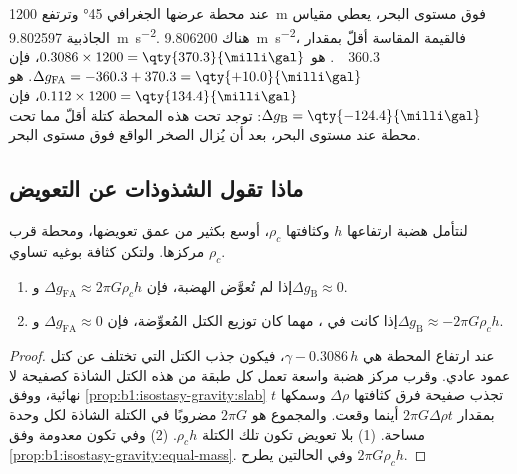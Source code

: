 \begin{example}\label{ex:b1:isostasy-gravity:reduction}
عند محطة عرضها الجغرافي \ang{45} وترتفع \qty{1200}{m} فوق مستوى البحر، يعطي مقياس الجاذبية \qty{9.802597}{m.s^{-2}}.  هناك \qty{9.806200}{m.s^{-2}}، فالقيمة المقاسة أقلّ بمقدار \qty{360.3}{\milli\gal}.  هو $0.3086\times1200 = \qty{370.3}{\milli\gal}$، فإن $\Delta g_{\mathrm{FA}} = -360.3 + 370.3 = \qty{+10.0}{\milli\gal}$.  هو $0.112\times1200 = \qty{134.4}{\milli\gal}$، فإن $\Delta g_{\mathrm B}
= \qty{-124.4}{\milli\gal}$: توجد تحت هذه المحطة كتلة أقلّ مما تحت محطة عند مستوى البحر، بعد أن يُزال الصخر الواقع فوق مستوى البحر.
\end{example}

\subsection*{ماذا تقول الشذوذات عن التعويض}

\begin{proposition}\label{prop:b1:isostasy-gravity:broad}
لنتأمل هضبة ارتفاعها $h$ وكثافتها $\rho_c$، أوسع بكثير من عمق تعويضها، ومحطة قرب مركزها. ولتكن كثافة بوغيه تساوي $\rho_c$.
\begin{enumerate}
  \item إذا لم تُعوَّض الهضبة، فإن $\Delta g_{\mathrm{FA}} \approx
        2\pi G\rho_c h$ و$\Delta g_{\mathrm B} \approx 0$.
  \item إذا كانت في ، مهما كان توزيع الكتل المُعوِّضة، فإن $\Delta g_{\mathrm{FA}} \approx 0$ و$\Delta g_{\mathrm B} \approx -2\pi G\rho_c h$.
\end{enumerate}
\end{proposition}

\begin{proof}
 عند ارتفاع المحطة هي $\gamma - 0.3086\,h$، فيكون  جذب الكتل التي تختلف عن كتل عمود عادي. وقرب مركز هضبة واسعة تعمل كل طبقة من هذه الكتل الشاذة كصفيحة لا نهائية، ووفق \cref{prop:b1:isostasy-gravity:slab} تجذب صفيحة فرق كثافتها $\Delta\rho$ وسمكها $t$ بمقدار $2\pi G\Delta\rho
t$ أينما وقعت. والمجموع هو $2\pi G$ مضروبًا في الكتلة الشاذة لكل وحدة مساحة. (1) بلا تعويض تكون تلك الكتلة $\rho_c h$. (2) وفي  تكون معدومة وفق \cref{prop:b1:isostasy-gravity:equal-mass}. وفي الحالتين يطرح  $2\pi G\rho_c h$.
\end{proof}

